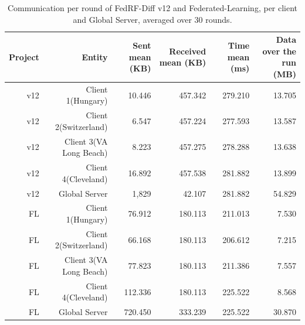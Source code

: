 \begin{table}[t]
\centering
\small
\caption{Communication per round of FedRF-Diff v12 and Federated-Learning, per client and Global Server, averaged over 30 rounds.}
\label{tab:v12_fl_comm}
\begin{tabular}{rrrrrr}
\toprule
Project & Entity & Sent mean (KB) & Received mean (KB) & Time mean (ms) & Data over the run (MB) \\
\midrule
v12 & Client 1(Hungary) & 10.446 & 457.342 & 279.210 & 13.705 \\
v12 & Client 2(Switzerland) & 6.547 & 457.224 & 277.593 & 13.587 \\
v12 & Client 3(VA Long Beach) & 8.223 & 457.275 & 278.288 & 13.638 \\
v12 & Client 4(Cleveland) & 16.892 & 457.538 & 281.882 & 13.899 \\
v12 & Global Server & 1,829 & 42.107 & 281.882 & 54.829 \\
FL & Client 1(Hungary) & 76.912 & 180.113 & 211.013 & 7.530 \\
FL & Client 2(Switzerland) & 66.168 & 180.113 & 206.612 & 7.215 \\
FL & Client 3(VA Long Beach) & 77.823 & 180.113 & 211.386 & 7.557 \\
FL & Client 4(Cleveland) & 112.336 & 180.113 & 225.522 & 8.568 \\
FL & Global Server & 720.450 & 333.239 & 225.522 & 30.870 \\
\bottomrule
\end{tabular}
\end{table}

